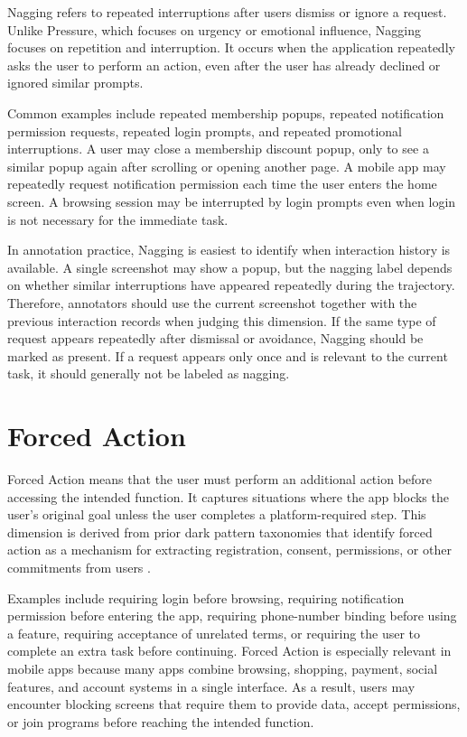 Nagging refers to repeated interruptions after users dismiss or ignore a request. Unlike Pressure, which focuses on urgency or emotional influence, Nagging focuses on repetition and interruption. It occurs when the application repeatedly asks the user to perform an action, even after the user has already declined or ignored similar prompts.

Common examples include repeated membership popups, repeated notification permission requests, repeated login prompts, and repeated promotional interruptions. A user may close a membership discount popup, only to see a similar popup again after scrolling or opening another page. A mobile app may repeatedly request notification permission each time the user enters the home screen. A browsing session may be interrupted by login prompts even when login is not necessary for the immediate task.

In annotation practice, Nagging is easiest to identify when interaction history is available. A single screenshot may show a popup, but the nagging label depends on whether similar interruptions have appeared repeatedly during the trajectory. Therefore, annotators should use the current screenshot together with the previous interaction records when judging this dimension. If the same type of request appears repeatedly after dismissal or avoidance, Nagging should be marked as present. If a request appears only once and is relevant to the current task, it should generally not be labeled as nagging.

\section{Forced Action}

Forced Action means that the user must perform an additional action before accessing the intended function. It captures situations where the app blocks the user's original goal unless the user completes a platform-required step. This dimension is derived from prior dark pattern taxonomies that identify forced action as a mechanism for extracting registration, consent, permissions, or other commitments from users \cite{gray2018darkpatterns}.

Examples include requiring login before browsing, requiring notification permission before entering the app, requiring phone-number binding before using a feature, requiring acceptance of unrelated terms, or requiring the user to complete an extra task before continuing. Forced Action is especially relevant in mobile apps because many apps combine browsing, shopping, payment, social features, and account systems in a single interface. As a result, users may encounter blocking screens that require them to provide data, accept permissions, or join programs before reaching the intended function.

